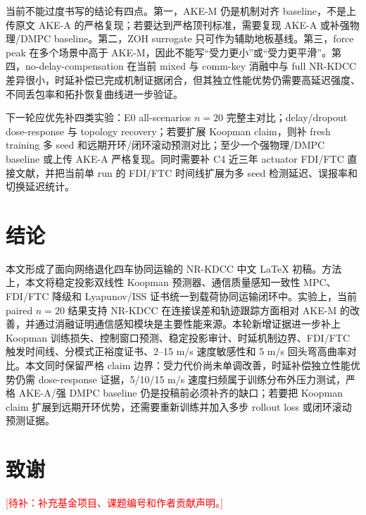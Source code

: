 \documentclass[twocolumn,3p,times,procedia]{elsarticle}
\newcommand{\todozh}[1]{\textcolor{red}{[待补：#1]}}
\newcommand{\AKE}{AKE-M}
\newcommand{\Method}{NR-KDCC}
\begin{document}
当前不能过度书写的结论有四点。第一，\AKE{} 仍是机制对齐 baseline，不是上传原文 AKE-A 的严格复现；若要达到严格顶刊标准，需要复现 AKE-A 或补强物理/DMPC baseline。第二，ZOH surrogate 只可作为辅助地板基线。第三，force peak 在多个场景中高于 \AKE{}，因此不能写“受力更小”或“受力更平滑”。第四，no-delay-compensation 在当前 mixed 与 comm-key 消融中与 full \Method{} 差异很小，时延补偿已完成机制证据闭合，但其独立性能优势仍需要高延迟强度、不同丢包率和拓扑恢复曲线进一步验证。

下一轮应优先补四类实验：E0 all-scenarios $n=20$ 完整主对比；delay/dropout dose-response 与 topology recovery；若要扩展 Koopman claim，则补 fresh training 多 seed 和远期开环/闭环滚动预测对比；至少一个强物理/DMPC baseline 或上传 AKE-A 严格复现。同时需要补 C4 近三年 actuator FDI/FTC 直接文献，并把当前单 run 的 FDI/FTC 时间线扩展为多 seed 检测延迟、误报率和切换延迟统计。

\section{结论}

本文形成了面向网络退化四车协同运输的 \Method{} 中文 LaTeX 初稿。方法上，本文将稳定投影双线性 Koopman 预测器、通信质量感知一致性 MPC、FDI/FTC 降级和 Lyapunov/ISS 证书统一到载荷协同运输闭环中。实验上，当前 paired $n=20$ 结果支持 \Method{} 在连接误差和轨迹跟踪方面相对 \AKE{} 的改善，并通过消融证明通信感知模块是主要性能来源。本轮新增证据进一步补上 Koopman 训练损失、控制窗口预测、稳定投影审计、时延机制边界、FDI/FTC 触发时间线、分模式正裕度证书、2--15 m/s 速度敏感性和 5 m/s 回头弯高曲率对比。本文同时保留严格 claim 边界：受力代价尚未单调改善，时延补偿独立性能优势仍需 dose-response 证据，5/10/15 m/s 速度扫频属于训练分布外压力测试，严格 AKE-A/强 DMPC baseline 仍是投稿前必须补齐的缺口；若要把 Koopman claim 扩展到远期开环优势，还需要重新训练并加入多步 rollout loss 或闭环滚动预测证据。

\section*{致谢}

\todozh{补充基金项目、课题编号和作者贡献声明。}

\FloatBarrier
\balance


\end{document}
